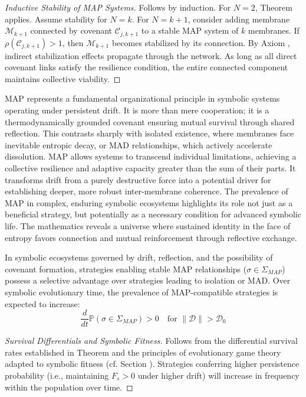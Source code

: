 \begin{proof}[Inductive Stability of MAP Systems]
\label{proof:bk5_inductive_stability_map}
Follows by induction. For $N=2$, Theorem  applies. Assume stability for $N=k$. For $N=k+1$, consider adding membrane $\mathscr{M}_{k+1}$ connected by covenant $\mathcal{C}_{j,k+1}$ to a stable MAP system of $k$ membranes. If $\rho(\mathcal{C}_{j,k+1}) > 1$, then $\mathscr{M}_{k+1}$ becomes stabilized by its connection. By Axiom , indirect stabilization effects propagate through the network. As long as all direct covenant links satisfy the resilience condition, the entire connected component maintains collective viability.
\end{proof}
\begin{scholium} \label{scholium:bk5_map_as_fundamental_organizational_principle}
MAP represents a fundamental organizational principle in symbolic systems operating under persistent drift. It is more than mere cooperation; it is a thermodynamically grounded covenant ensuring mutual survival through shared reflection. This contrasts sharply with isolated existence, where membranes face inevitable entropic decay, or MAD relationships, which actively accelerate dissolution. MAP allows systems to transcend individual limitations, achieving a collective resilience and adaptive capacity greater than the sum of their parts. It transforms drift from a purely destructive force into a potential driver for establishing deeper, more robust inter-membrane coherence. The prevalence of MAP in complex, enduring symbolic ecosystems highlights its role not just as a beneficial strategy, but potentially as a necessary condition for advanced symbolic life. The mathematics reveals a universe where sustained identity in the face of entropy favors connection and mutual reinforcement through reflective exchange.
\end{scholium}
\begin{corollary} \label{corollary:bk5_map_evolutionary_advantag}
In symbolic ecosystems governed by drift, reflection, and the possibility of covenant formation, strategies enabling stable MAP relationships ($\sigma \in \Sigma_{MAP}$) possess a selective advantage over strategies leading to isolation or MAD. Over symbolic evolutionary time, the prevalence of MAP-compatible strategies is expected to increase:
\begin{equation}
\frac{d}{dt} \mathbb{P}(\sigma \in \Sigma_{MAP}) > 0 \quad \text{for } \|\mathcal{D}\| > \mathcal{D}_0
\end{equation}
\end{corollary}
\begin{proof}[Survival Differentials and Symbolic Fitness]
\label{proof:bk5_symbolic_fitness_differentials}
Follows from the differential survival rates established in Theorem  and the principles of evolutionary game theory adapted to symbolic fitness (cf. Section ). Strategies conferring higher persistence probability (i.e., maintaining $F_s > 0$ under higher drift) will increase in frequency within the population over time.
\end{proof}
